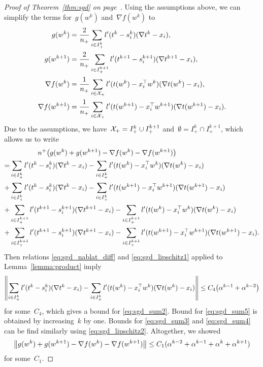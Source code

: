 \begin{proof}[Proof of Theorem~\ref{thm:sgd} on page~\pageref{thm:sgd}]
  Using the assumptions above, we can simplify the terms for~$g(w^k)$ and~$\nabla f(w^k)$ to
  \begin{equation*}
    \begin{aligned}
      g(w^k)
      & = \frac{2}{n_+}\sum_{i\in I_+^k}l'(t^k-s_i^k)(\nabla t^k - x_i), \\
      g(w^{k+1})
      & = \frac{2}{n_+}\sum_{i\in I_+^{k+1}}l'(t^{k+1}-s_i^{k+1})(\nabla t^{k+1} - x_i), \\
      \nabla f(w^k)
      & = \frac{1}{n_+}\sum_{i \in \mathcal{X}_+}l'(t(w^k)-x_i^\top w^k)(\nabla t(w^k) - x_i), \\
      \nabla f(w^{k+1})
      & = \frac{1}{n_+}\sum_{i \in \mathcal{X}_+}l'(t(w^{k+1})-x_i^\top w^{k+1})(\nabla t(w^{k+1}) - x_i).
    \end{aligned}
  \end{equation*}
  Due to the assumptions, we have~$\mathcal{X}_+=I_+^k\cup I_+^{k+1}$ and~$\emptyset=I_+^k\cap I_+^{k+1}$, which allows us to write
  \begin{subequations}\label{eq:sgd_sum}
    \begin{align}
    \label{eq:sgd_sum1}
    & \qquad\qquad n^+\Brac{g(w^k)+g(w^{k+1})-\nabla f(w^k)-\nabla f(w^{k+1})}\\
    \label{eq:sgd_sum2}
    = & \sum_{i\in I_+^k}l'(t^k-s_i^k)(\nabla t^k - x_i) - \sum_{i\in I_+^k}l'(t(w^k)-x_i^\top w^k)(\nabla t(w^k) - x_i) \\
    \label{eq:sgd_sum3}
    + &\sum_{i\in I_+^k}l'(t^k-s_i^k)(\nabla t^k - x_i) - \sum_{i\in I_+^k}l'(t(w^{k+1})-x_i^\top w^{k+1})(\nabla t(w^{k+1}) - x_i)\\
    \label{eq:sgd_sum4}
    + &\sum_{i\in I_+^{k+1}}l'(t^{k+1}-s_i^{k+1})(\nabla t^{k+1} - x_i) - \sum_{i\in I^{k+1}_+}l'(t(w^k)-x_i^\top w^k)(\nabla t(w^k) - x_i) \\
    \label{eq:sgd_sum5}
    + &\sum_{i\in I_+^{k+1}}l'(t^{k+1}-s_i^{k+1})(\nabla t^{k+1} - x_i)  - \sum_{i\in I_+^{k+1}}l'(t(w^{k+1})-x_i^\top w^{k+1})(\nabla t(w^{k+1}) - x_i).
    \end{align}
  \end{subequations}
  Then relations \eqref{eq:sgd_nablat_diff} and \eqref{eq:sgd_lipschitz1} applied to Lemma~\ref{lemma:product} imply
  \begin{equation*}
    \nrm{\sum_{i\in I_+^k}l'(t^k-s_i^k)(\nabla t^k - x_i) - \sum_{i\in I_+^k}l'(t(w^k)-x_i^\top w^k)(\nabla t(w^k) - x_i)} \le C_4\Brac{\alpha^{k-1} + \alpha^{k-2}}
  \end{equation*}
  for some~$C_4$, which gives a bound for \eqref{eq:sgd_sum2}. Bound for \eqref{eq:sgd_sum5} is obtained by increasing~$k$ by one. Bounds for \eqref{eq:sgd_sum3} and \eqref{eq:sgd_sum4} can be find similarly using \eqref{eq:sgd_lipschitz2}. Altogether, we showed
  \begin{equation}\label{eq:nec_cond3}
  \norm{g(w^k)+g(w^{k+1})-\nabla f(w^k)-\nabla f(w^{k+1})} \le C_1(\alpha^{k-2} + \alpha^{k-1} + \alpha^{k} + \alpha^{k+1})
  \end{equation}
  for some~$C_1$.


\end{proof}
